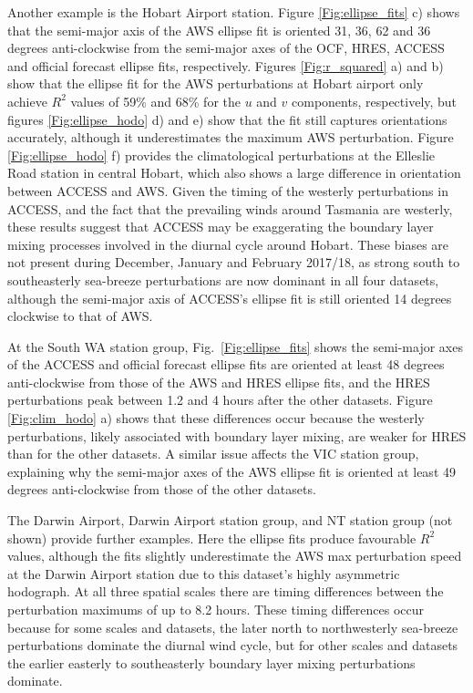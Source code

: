 \documentclass[twocol]{ametsoc}
\begin{document}
Another example is the Hobart Airport station. Figure \ref{Fig:ellipse_fits} c) shows that the semi-major axis of the AWS ellipse fit is oriented 31, 36, 62 and 36 degrees anti-clockwise from the semi-major axes of the OCF, HRES, ACCESS and  official forecast ellipse fits, respectively. Figures \ref{Fig:r_squared} a) and b) show that the ellipse fit for the AWS perturbations at Hobart airport only achieve $R^2$ values of 59\% and 68\% for the $u$ and $v$ components, respectively, but figures \ref{Fig:ellipse_hodo} d) and e) show that the fit still captures orientations accurately, although it underestimates the maximum AWS perturbation. Figure \ref{Fig:ellipse_hodo} f) provides the climatological perturbations at the Elleslie Road station in central Hobart, which also shows a large difference in orientation between ACCESS and AWS. Given the timing of the westerly perturbations in ACCESS, and the fact that the prevailing winds around Tasmania are westerly, these results suggest that ACCESS may be exaggerating the boundary layer mixing processes involved in the diurnal cycle around Hobart. These biases are not present during December, January and February 2017/18, as strong south to southeasterly sea-breeze perturbations are now dominant in all four datasets, although the semi-major axis of ACCESS's ellipse fit is still oriented 14 degrees clockwise to that of AWS. 

At the South WA station group, Fig.~\ref{Fig:ellipse_fits} shows the semi-major axes of the ACCESS and official forecast ellipse fits are oriented at least 48 degrees anti-clockwise from those of the AWS and HRES ellipse fits, and the HRES perturbations peak between 1.2 and 4 hours after the other datasets. Figure \ref{Fig:clim_hodo} a) shows that these differences occur because the westerly perturbations, likely associated with boundary layer mixing, are weaker for HRES than for the other datasets. A similar issue affects the VIC station group, explaining why the semi-major axes of the AWS ellipse fit is oriented at least 49 degrees anti-clockwise from those of the other datasets. 

The Darwin Airport, Darwin Airport station group, and NT station group (not shown) provide further examples. Here the ellipse fits produce favourable $R^2$ values, although the fits slightly underestimate the AWS max perturbation speed at the Darwin Airport station due to this dataset's highly asymmetric hodograph. At all three spatial scales there are timing differences between the perturbation maximums of up to 8.2 hours. These timing differences occur because for some scales and datasets, the later north to northwesterly sea-breeze perturbations dominate the diurnal wind cycle, but for other scales and datasets the earlier easterly to southeasterly boundary layer mixing perturbations dominate.
\end{document}
